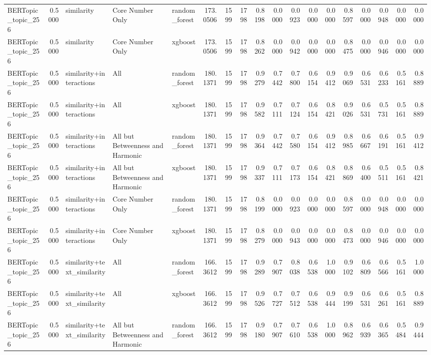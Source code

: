 \begin{tabular}{lrlllrrrrrrrrrrrrr}
BERTopic_topic_256 & 0.5000 & similarity & Core Number Only & random_forest & 173.0506 & 1599 & 1798 & 0.8198 & 0.0000 & 0.0923 & 0.0000 & 0.0000 & 0.8597 & 0.0000 & 0.0948 & 0.0000 & 0.0000 \\
BERTopic_topic_256 & 0.5000 & similarity & Core Number Only & xgboost & 173.0506 & 1599 & 1798 & 0.8262 & 0.0000 & 0.0942 & 0.0000 & 0.0000 & 0.8475 & 0.0000 & 0.0946 & 0.0000 & 0.0000 \\
BERTopic_topic_256 & 0.5000 & similarity+interactions & All & random_forest & 180.1371 & 1599 & 1798 & 0.9279 & 0.7442 & 0.7800 & 0.6154 & 0.9412 & 0.9069 & 0.6531 & 0.6233 & 0.5161 & 0.8889 \\
BERTopic_topic_256 & 0.5000 & similarity+interactions & All & xgboost & 180.1371 & 1599 & 1798 & 0.9582 & 0.7111 & 0.7124 & 0.6154 & 0.8421 & 0.9026 & 0.6531 & 0.5731 & 0.5161 & 0.8889 \\
BERTopic_topic_256 & 0.5000 & similarity+interactions & All but Betweenness and Harmonic & random_forest & 180.1371 & 1599 & 1798 & 0.9364 & 0.7442 & 0.7580 & 0.6154 & 0.9412 & 0.8985 & 0.6667 & 0.6191 & 0.5161 & 0.9412 \\
BERTopic_topic_256 & 0.5000 & similarity+interactions & All but Betweenness and Harmonic & xgboost & 180.1371 & 1599 & 1798 & 0.9337 & 0.7111 & 0.7173 & 0.6154 & 0.8421 & 0.8869 & 0.6400 & 0.5511 & 0.5161 & 0.8421 \\
BERTopic_topic_256 & 0.5000 & similarity+interactions & Core Number Only & random_forest & 180.1371 & 1599 & 1798 & 0.8199 & 0.0000 & 0.0923 & 0.0000 & 0.0000 & 0.8597 & 0.0000 & 0.0948 & 0.0000 & 0.0000 \\
BERTopic_topic_256 & 0.5000 & similarity+interactions & Core Number Only & xgboost & 180.1371 & 1599 & 1798 & 0.8279 & 0.0000 & 0.0943 & 0.0000 & 0.0000 & 0.8473 & 0.0000 & 0.0946 & 0.0000 & 0.0000 \\
BERTopic_topic_256 & 0.5000 & similarity+text_similarity & All & random_forest & 166.3612 & 1599 & 1798 & 0.9289 & 0.7907 & 0.8038 & 0.6538 & 1.0000 & 0.9102 & 0.6809 & 0.6566 & 0.5161 & 1.0000 \\
BERTopic_topic_256 & 0.5000 & similarity+text_similarity & All & xgboost & 166.3612 & 1599 & 1798 & 0.9526 & 0.7727 & 0.7512 & 0.6538 & 0.9444 & 0.9199 & 0.6531 & 0.6261 & 0.5161 & 0.8889 \\
BERTopic_topic_256 & 0.5000 & similarity+text_similarity & All but Betweenness and Harmonic & random_forest & 166.3612 & 1599 & 1798 & 0.9180 & 0.7907 & 0.7610 & 0.6538 & 1.0000 & 0.8962 & 0.6939 & 0.6365 & 0.5484 & 0.9444 \\

\end{tabular}

